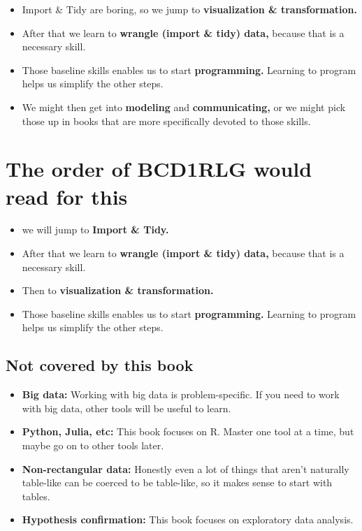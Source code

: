 \documentclass[
  letterpaper,
  DIV=11,
  numbers=noendperiod]{scrartcl}
\providecommand{\tightlist}{%
  \setlength{\itemsep}{0pt}\setlength{\parskip}{0pt}}\usepackage{longtable,booktabs,array}
\begin{document}
\begin{itemize}
\tightlist
\item
  Import \& Tidy are boring, so we jump to \textbf{visualization \&
  transformation.}
\item
  After that we learn to \textbf{wrangle (import \& tidy) data,} because
  that is a necessary skill.
\item
  Those baseline skills enables us to start \textbf{programming.}
  Learning to program helps us simplify the other steps.
\item
  We might then get into \textbf{modeling} and \textbf{communicating,}
  or we might pick those up in books that are more specifically devoted
  to those skills.
\end{itemize}

\hypertarget{the-order-of-bcd1rlg-would-read-for-this}{%
\section{The order of BCD1RLG would read for
this}\label{the-order-of-bcd1rlg-would-read-for-this}}

\begin{itemize}
\tightlist
\item
  we will jump to \textbf{Import \& Tidy.}
\item
  After that we learn to \textbf{wrangle (import \& tidy) data,} because
  that is a necessary skill.
\item
  Then to \textbf{visualization \& transformation.}
\item
  Those baseline skills enables us to start \textbf{programming.}
  Learning to program helps us simplify the other steps.
\end{itemize}

\hypertarget{not-covered-by-this-book}{%
\subsection{Not covered by this book}\label{not-covered-by-this-book}}

\begin{itemize}
\tightlist
\item
  \textbf{Big data:} Working with big data is problem-specific. If you
  need to work with big data, other tools will be useful to learn.
\item
  \textbf{Python, Julia, etc:} This book focuses on R. Master one tool
  at a time, but maybe go on to other tools later.
\item
  \textbf{Non-rectangular data:} Honestly even a lot of things that
  aren't naturally table-like can be coerced to be table-like, so it
  makes sense to start with tables.
\item
  \textbf{Hypothesis confirmation:} This book focuses on exploratory
  data analysis.
\end{itemize}
\end{document}
